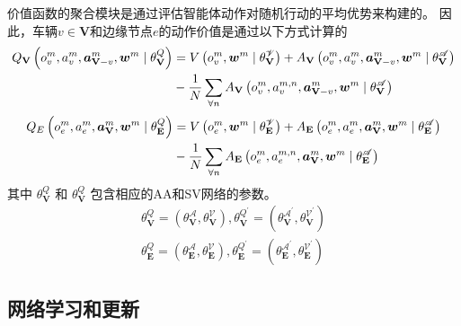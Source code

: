 价值函数的聚合模块是通过评估智能体动作对随机行动的平均优势来构建的。
因此，车辆$v\in\mathbf{V}$和边缘节点$e$的动作价值是通过以下方式计算的 
\begin{align}
    Q_{\mathbf{V}}\left({o}_{v}^{m}, {a}_{v}^{m}, \boldsymbol{a}_{\boldsymbol{\mathbf{V}}-v}^{m}, \boldsymbol{w}^{m} \mid \theta_{\mathbf{V}}^{Q} \right) &= V\left({o}_{v}^{m}, \boldsymbol{w}^{m} \mid \theta_{\mathbf{V}}^{\mathscr{V}} \right) + A_{\mathbf{V}}\left({o}_{v}^{m},  {a}_{v}^{m}, \boldsymbol{a}_{\boldsymbol{\mathbf{V}}-v}^{m}, \boldsymbol{w}^{m} \mid \theta_{\mathbf{V}}^{\mathscr{A}} \right) \notag \\
    &- \frac{1}{N} \sum_{\forall n} A_{\mathbf{V}}\left({o}_{v}^{m},  {a}_{v}^{m, n}, \boldsymbol{a}_{\boldsymbol{\mathbf{V}}-v}^{m}, \boldsymbol{w}^{m} \mid \theta_{\mathbf{V}}^{\mathscr{A}} \right)
\end{align}
\begin{align}
    Q_{E}\left({o}_{e}^{m},  {a}_{e}^{m}, \boldsymbol{a}_{\boldsymbol{\mathbf{V}}}^{m}, \boldsymbol{w}^{m} \mid \theta_{\mathbf{E}}^{Q} \right) &= V\left({o}_{e}^{m}, \boldsymbol{w}^{m} \mid \theta_{\mathbf{E}}^{\mathscr{V}} \right) + A_{\mathbf{E}}\left({o}_{e}^{m},  {a}_{e}^{m}, \boldsymbol{a}_{\boldsymbol{\mathbf{V}}}^{m}, \boldsymbol{w}^{m} \mid \theta_{\mathbf{E}}^{\mathscr{A}} \right) \notag \\
    &- \frac{1}{N} \sum_{\forall n} A_{\mathbf{E}}\left({o}_{e}^{m},  {a}_{e}^{m, n}, \boldsymbol{a}_{\boldsymbol{\mathbf{V}}}^{m}, \boldsymbol{w}^{m} \mid \theta_{\mathbf{E}}^{\mathscr{A}} \right)
\end{align}
其中 $\theta_{\mathbf{V}}^{Q}$ 和 $\theta_{\mathbf{V}}^{Q}$ 包含相应的AA和SV网络的参数。
\begin{align}
	\theta_{\mathbf{V}}^{Q} = (\theta_{\mathbf{V}}^{\mathscr{A}}, \theta_{\mathbf{V}}^{\mathscr{V}}), \theta_{\mathbf{V}}^{Q^{\prime}} = (\theta_{\mathbf{V}}^{\mathscr{A}^{\prime}}, \theta_{\mathbf{V}}^{\mathscr{V}^{\prime}}) \\
	\theta_{\mathbf{E}}^{Q} = (\theta_{\mathbf{E}}^{\mathscr{A}}, \theta_{\mathbf{E}}^{\mathscr{V}}), \theta_{\mathbf{E}}^{Q^{\prime}} = (\theta_{\mathbf{E}}^{\mathscr{A}^{\prime}}, \theta_{\mathbf{E}}^{\mathscr{V}^{\prime}})
\end{align}

\subsection{网络学习和更新}

